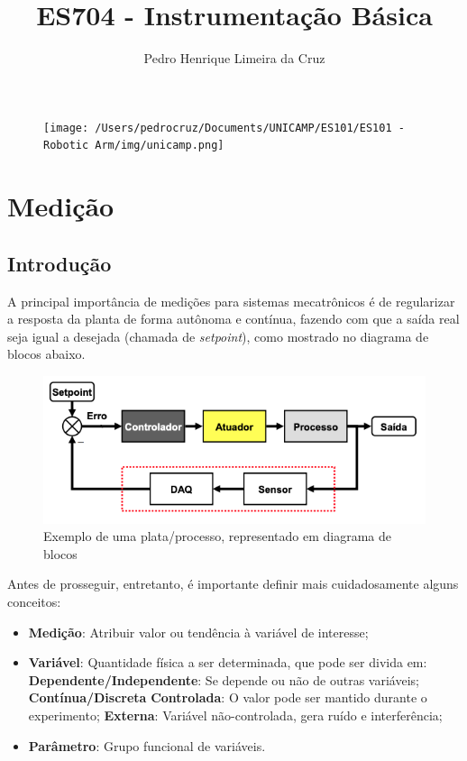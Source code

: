 \documentclass{article}
\author{Pedro Henrique Limeira da Cruz}
\title{ES704 - Instrumentação Básica}
\begin{document}
    \maketitle
    \thispagestyle{empty}

    \begin{figure}[h]
        \begin{center}
            \texttt{[image: /Users/pedrocruz/Documents/UNICAMP/ES101/ES101 - Robotic Arm/img/unicamp.png]}
        \end{center}
    \end{figure}

    \newpage
    \tableofcontents
    \newpage

    \section{Medição}
        
        \subsection{Introdução}
            A principal importância de medições para sistemas mecatrônicos é de regularizar a resposta da planta de forma autônoma e contínua, fazendo com que a saída real seja igual a desejada (chamada
            de \emph{setpoint}), como mostrado no diagrama de blocos abaixo.

            \begin{figure}[h]
                \centering
                \includegraphics[width=.5\textwidth]{imgs/diag_blocos.png}
                \caption{Exemplo de uma plata/processo, representado em diagrama de blocos}
            \end{figure}

            Antes de prosseguir, entretanto, é importante definir mais cuidadosamente alguns conceitos:
            \begin{itemize}
                \item \textbf{Medição}: Atribuir valor ou tendência à variável de interesse;
                \item \textbf{Variável}: Quantidade física a ser determinada, que pode ser divida em:
                    \subitem \textbf{Dependente/Independente}: Se depende ou não de outras variáveis;
                    \subitem \textbf{Contínua/Discreta}
                    \subitem \textbf{Controlada}: O valor pode ser mantido durante o experimento;
                    \subitem \textbf{Externa}: Variável não-controlada, gera ruído e interferência;
                \item \textbf{Parâmetro}: Grupo funcional de variáveis.
            \end{itemize}
\end{document}
